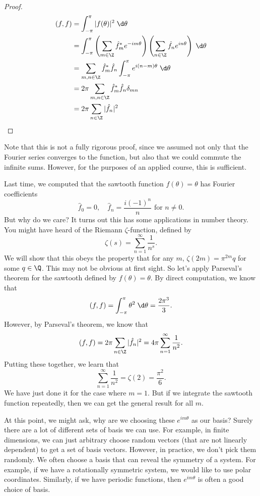 \documentclass[a4paper]{article}
\begin{document}
\begin{proof}
  \begin{align*}
    (f, f) &= \int_{-\pi}^\pi |f(\theta)|^2 \;\d \theta\\
    &= \int_{-\pi}^{\pi} \left(\sum_{m \in \Z} \hat{f}_m^* e^{-im\theta}\right)\left(\sum_{n \in \Z} \hat{f}_n e^{in\theta}\right)\;\d \theta\\
    &= \sum_{m, n\in \Z}\hat{f}_m^* \hat{f}_n \int_{-\pi}^\pi e^{i(n - m)\theta}\;\d \theta\\
    &= 2\pi \sum_{m, n\in \Z}\hat{f}_m^* \hat{f}_n \delta_{mn}\\
    &= 2\pi \sum_{n\in \Z}|\hat{f}_n|^2
  \end{align*}
\end{proof}
Note that this is not a fully rigorous proof, since we assumed not only that the Fourier series converges to the function, but also that we could commute the infinite sums. However, for the purposes of an applied course, this is sufficient.

Last time, we computed that the sawtooth function $f(\theta) = \theta$ has Fourier coefficients
\[
  \hat{f}_0 = 0,\quad \hat{f}_n = \frac{i(-1)^{n}}{n}\text{ for }n\not= 0.
\]
But why do we care? It turns out this has some applications in number theory. You might have heard of the Riemann $\zeta$-function, defined by
\[
  \zeta(s) = \sum_{n = 1}^\infty \frac{1}{n^s}.
\]
We will show that this obeys the property that for any $m$, $\zeta(2m) = \pi^{2m}q$ for some $q\in \Q$. This may not be obvious at first sight. So let's apply Parseval's theorem for the sawtooth defined by $f(\theta) = \theta$. By direct computation, we know that
\[
  (f, f) = \int_{-\pi}^\pi \theta^2 \;\d \theta = \frac{2\pi^3}{3}.
\]
However, by Parseval's theorem, we know that
\[
  (f, f) = 2\pi \sum_{n \in \Z}|\hat{f}_n|^2 = 4\pi \sum_{n = 1}^\infty \frac{1}{n^2}.
\]
Putting these together, we learn that
\[
  \sum_{n = 1}^\infty \frac{1}{n^2} = \zeta(2) = \frac{\pi^2}{6}.
\]
We have just done it for the case where $m = 1$. But if we integrate the sawtooth function repeatedly, then we can get the general result for all $m$.

At this point, we might ask, why are we choosing these $e^{im\theta}$ as our basis? Surely there are a lot of different sets of basis we can use. For example, in finite dimensions, we can just arbitrary choose random vectors (that are not linearly dependent) to get a set of basis vectors. However, in practice, we don't pick them randomly. We often choose a basis that can reveal the symmetry of a system. For example, if we have a rotationally symmetric system, we would like to use polar coordinates. Similarly, if we have periodic functions, then $e^{im\theta}$ is often a good choice of basis.
\end{document}
